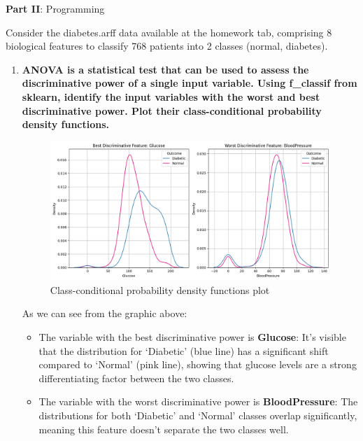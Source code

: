 \documentclass[12pt]{article}
\begin{document}
\vspace{1cm}

\large{\textbf{Part II}: Programming}\normalsize

\vspace{1cm}

Consider the diabetes.arff data available at the homework tab, comprising 8 biological
features to classify 768 patients into 2 classes (normal, diabetes).

\vspace{0.5cm}

\begin{enumerate}[leftmargin=\labelsep,resume]
\setcounter{enumi}{0}
\item \textbf{ANOVA is a statistical test that can be used to assess the discriminative power of a
single input variable. Using f\_classif from sklearn, identify the input variables with the
worst and best discriminative power. Plot their class-conditional probability density
functions.}

\vspace{1cm}



    \begin{figure}[H]
        \centering
          \includegraphics[width=12cm]{./Part II/1.png}
          \caption{Class-conditional probability density functions plot}
    \end{figure}

\vspace{2cm}

As we can see from the graphic above:
\begin{itemize}
    \item The variable with the best discriminative power is \textbf{Glucose}: It's visible that the distribution for `Diabetic' (blue line) has a significant shift compared to `Normal' (pink line), showing that glucose levels are a strong differentiating factor between the two classes.
    \item The variable with the worst discriminative power is \textbf{BloodPressure}: The distributions for both `Diabetic' and `Normal' classes overlap significantly, meaning this feature doesn't separate the two classes well.
\end{itemize}


\end{enumerate}
\end{document}
